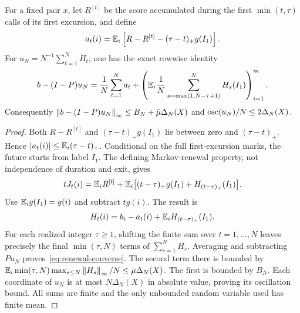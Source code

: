 \begin{lemma}\label{lem:renewal-converse}
For a fixed pair $x$, let $R^{[t]}$ be the score accumulated during the first $\min(t,\tau)$ calls of its first excursion, and define
\[
 a_t(i)=\mathbb E_i\left[R-R^{[t]}-(\tau-t)_+g(I_1)\right].
\]
For $u_N=N^{-1}\sum_{t=1}^NH_t$, one has the exact rowwise identity
\begin{equation}\label{eq:renewal-converse}
 b-(I-P)u_N
 =\frac1N\sum_{t=1}^Na_t
  +\left(\mathbb E_i\frac1N
       \sum_{s=\max(1,N-\tau+1)}^NH_s(I_1)\right)_{i=1}^m.
\end{equation}
Consequently $\left\lVert b-(I-P)u_N\right\rVert_\infty\le B_N+\bar\mu\Delta_N(X)$ and $\operatorname{osc}(u_N)/N\le2\Delta_N(X)$.
\end{lemma}
\begin{proof}
Both $R-R^{[t]}$ and $(\tau-t)_+g(I_1)$ lie between zero and $(\tau-t)_+$. Hence $|a_t(i)|\le\mathbb E_i(\tau-t)_+$. Conditional on the full first-excursion marks, the future starts from label $I_1$. The defining Markov-renewal property, not independence of duration and exit, gives
\[
 tJ_t(i)=\mathbb E_iR^{[t]}+
     \mathbb E_i\bigl[(t-\tau)_+g(I_1)+H_{(t-\tau)_+}(I_1)\bigr].
\]
Use $\mathbb E_i g(I_1)=g(i)$ and subtract $tg(i)$. The result is
\[
 H_t(i)=b_i-a_t(i)+\mathbb E_iH_{(t-\tau)_+}(I_1).
\]
For each realized integer $\tau\ge1$, shifting the finite sum over $t=1,\ldots,N$ leaves precisely the final $\min(\tau,N)$ terms of $\sum_{s=1}^NH_s$. Averaging and subtracting $Pu_N$ proves~\eqref{eq:renewal-converse}. The second term there is bounded by
$\mathbb E_i\min(\tau,N)\max_{s\le N}\left\lVert H_s\right\rVert_\infty/N\le\bar\mu\Delta_N(X)$.
The first is bounded by $B_N$. Each coordinate of $u_N$ is at most $N\Delta_N(X)$ in absolute value, proving its oscillation bound. All sums are finite and the only unbounded random variable used has finite mean.
\end{proof}

